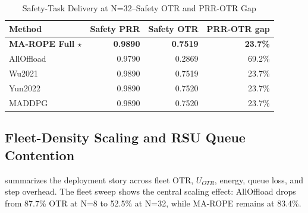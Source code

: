 \begin{table}[htbp]
\caption{MADDPG Upper Bound vs. MA-ROPE--URLLC stress, N=32 vehicles}
\label{tab:maddpg_upper}
\centering
{}
\end{table}

\begin{table}[htbp]
\caption{Safety-Task Delivery at N=32--Safety OTR and PRR-OTR Gap}
\label{tab:safety_task}
\centering
\begin{tabular}{lrrr}
\toprule
\textbf{Method} & \textbf{Safety PRR} & \textbf{Safety OTR} & \textbf{PRR-OTR gap} \\
\midrule
\textbf{MA-ROPE Full $\star$} & \textbf{0.9890} & \textbf{0.7519} & \textbf{23.7\%} \\
AllOffload & 0.9790 & 0.2869 & 69.2\% \\
Wu2021 & 0.9890 & 0.7519 & 23.7\% \\
Yun2022 & 0.9890 & 0.7520 & 23.7\% \\
MADDPG & 0.9890 & 0.7520 & 23.7\% \\
\bottomrule
\end{tabular}
\end{table}

\subsection{Fleet-Density Scaling and RSU Queue Contention}

 summarizes the deployment story across fleet OTR, $U_{OTR}$, energy, queue loss, and step overhead. The fleet sweep shows the central scaling effect: AllOffload drops from 87.7\% OTR at N=8 to 52.5\% at N=32, while MA-ROPE remains at 83.4\%.

